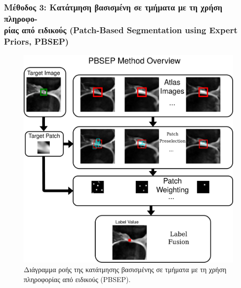 \documentclass{beamer}
\begin{document}
\begin{frame}
\frametitle{\normalsize Μέθοδος 3: Κατάτμηση βασισμένη σε τμήματα με τη χρήση
πληροφο-\\ρίας από ειδικούς (Patch-Based Segmentation using Expert Priors, PBSEP)}

\begin{figure}[H]
    \centering
    \includegraphics[height=0.8\textheight]{PBSEP_method.png}
    \caption{Διάγραμμα ροής της κατάτμησης βασισμένης σε τμήματα με τη χρήση
             πληροφορίας από ειδικούς (PBSEP).}
\end{figure}

\end{frame}
\end{document}

